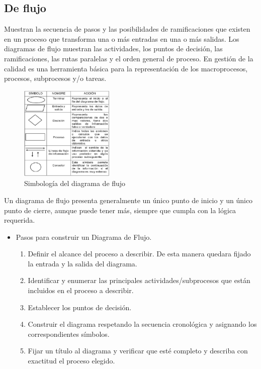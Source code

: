 \documentclass{article}
\theoremstyle{mytheoremstyle}
\theoremstyle{mytheoremstyle}
\theoremstyle{myproblemstyle}
\begin{document}
\begin{enumerate}
\begin{itemize}
		  \section{De flujo}
		  Muestran la secuencia de pasos y las posibilidades de ramificaciones que existen en un proceso que
		  transforma una o más entradas en una o más salidas. Los diagramas de flujo muestran las actividades,
		  los puntos de decisión, las ramificaciones, las rutas paralelas y el orden general de proceso.
		  En gestión de la calidad es una herramienta básica para la representación de los macroprocesos, procesos, subprocesos y/o tareas.
		  \begin{figure}[H]
			\centering
			\includegraphics[width=0.4\textwidth]{flujo_simb.png}
			\caption{Simbología del diagrama de flujo}
			\label{fig:imagen2}
		\end{figure}
		Un diagrama de flujo presenta generalmente un único punto de inicio y un único punto de cierre, aunque puede tener más, siempre que cumpla con la lógica requerida.
		\begin{itemize}
			\item Pasos para construir un Diagrama de Flujo.
			\begin{enumerate}
				\item Definir el alcance del proceso a describir. De esta manera quedara fijado la entrada y la salida del diagrama.
				\item Identificar y enumerar las principales actividades/subprocesos que están incluidos en el proceso a describir.
				\item Establecer los puntos de decisión.
				\item Construir el diagrama respetando la secuencia cronológica y asignando los correspondientes símbolos.
				\item Fijar un título al diagrama y verificar que esté completo y describa con exactitud el proceso elegido.
			\end{enumerate}
		\end{itemize}  

\end{itemize}
\end{enumerate}
\end{document}
